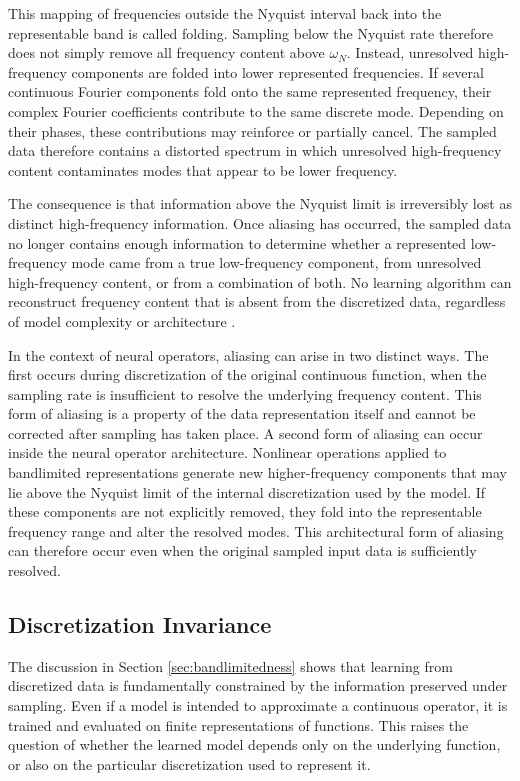 This mapping of frequencies outside the Nyquist interval back into the representable band is called folding. Sampling below the Nyquist rate therefore does not simply remove all frequency content above \(\omega_N\). Instead, unresolved high-frequency components are folded into lower represented frequencies. If several continuous Fourier components fold onto the same represented frequency, their complex Fourier coefficients contribute to the same discrete mode. Depending on their phases, these contributions may reinforce or partially cancel. The sampled data therefore contains a distorted spectrum in which unresolved high-frequency content contaminates modes that appear to be lower frequency.

The consequence is that information above the Nyquist limit is irreversibly lost as distinct high-frequency information. Once aliasing has occurred, the sampled data no longer contains enough information to determine whether a represented low-frequency mode came from a true low-frequency component, from unresolved high-frequency content, or from a combination of both. No learning algorithm can reconstruct frequency content that is absent from the discretized data, regardless of model complexity or architecture \cite{bartolucci-discretization-invariance}.

In the context of neural operators, aliasing can arise in two distinct ways. The first occurs during discretization of the original continuous function, when the sampling rate is insufficient to resolve the underlying frequency content. This form of aliasing is a property of the data representation itself and cannot be corrected after sampling has taken place. A second form of aliasing can occur inside the neural operator architecture. Nonlinear operations applied to bandlimited representations generate new higher-frequency components that may lie above the Nyquist limit of the internal discretization used by the model. If these components are not explicitly removed, they fold into the representable frequency range and alter the resolved modes. This architectural form of aliasing can therefore occur even when the original sampled input data is sufficiently resolved.


\subsection{Discretization Invariance}\label{sec:discretization-invariance}

The discussion in Section \ref{sec:bandlimitedness} shows that learning from discretized data is fundamentally constrained by the information preserved under sampling. Even if a model is intended to approximate a continuous operator, it is trained and evaluated on finite representations of functions. This raises the question of whether the learned model depends only on the underlying function, or also on the particular discretization used to represent it.

